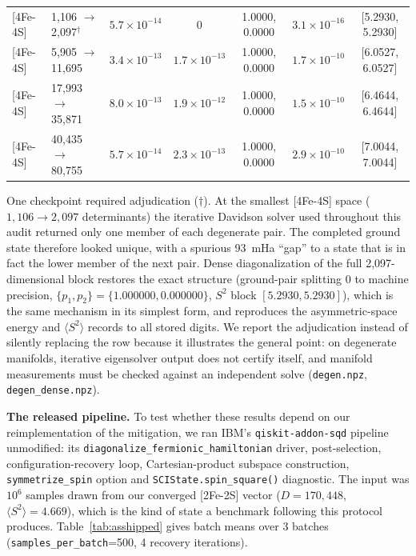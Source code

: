 \documentclass[11pt]{article}
\newcommand{\ssq}{\ensuremath{\langle S^2\rangle}}
\begin{document}
\begin{table}[t]
\begin{tabular}{llccccc}
{[4Fe-4S]} & 1,106 $\to$ 2,097$^\dagger$ & $5.7\times10^{-14}$ & $0$ & 1.0000, 0.0000 & $3.1\times10^{-16}$ & [5.2930, 5.2930] \\
{[4Fe-4S]} & 5,905 $\to$ 11,695 & $3.4\times10^{-13}$ & $1.7\times10^{-13}$ & 1.0000, 0.0000 & $1.7\times10^{-10}$ & [6.0527, 6.0527] \\
{[4Fe-4S]} & 17,993 $\to$ 35,871 & $8.0\times10^{-13}$ & $1.9\times10^{-12}$ & 1.0000, 0.0000 & $1.5\times10^{-10}$ & [6.4644, 6.4644] \\
{[4Fe-4S]} & 40,435 $\to$ 80,755 & $5.7\times10^{-14}$ & $2.3\times10^{-13}$ & 1.0000, 0.0000 & $2.9\times10^{-10}$ & [7.0044, 7.0044] \\
\hline
\end{tabular}
\end{table}

One checkpoint required adjudication ($\dagger$). At the smallest [4Fe-4S] space ($1{,}106 \to 2{,}097$ determinants) the iterative Davidson solver used throughout this audit returned only one member of each degenerate pair. The completed ground state therefore looked unique, with a spurious 93~mHa ``gap'' to a state that is in fact the lower member of the next pair. Dense diagonalization of the full 2,097-dimensional block restores the exact structure (ground-pair splitting 0 to machine precision, $\{p_1, p_2\} = \{1.000000, 0.000000\}$, $S^2$ block $[5.2930, 5.2930]$), which is the same mechanism in its simplest form, and reproduces the asymmetric-space energy and \ssq{} records to all stored digits. We report the adjudication instead of silently replacing the row because it illustrates the general point: on degenerate manifolds, iterative eigensolver output does not certify itself, and manifold measurements must be checked against an independent solve (\texttt{degen.npz}, \texttt{degen\_dense.npz}).

\textbf{The released pipeline.} To test whether these results depend on our reimplementation of the mitigation, we ran IBM's \texttt{qiskit-addon-sqd} pipeline unmodified: its \texttt{diagonalize\_fermionic\_hamiltonian} driver, post-selection, configuration-recovery loop, Cartesian-product subspace construction, \texttt{symmetrize\_spin} option and \texttt{SCIState.spin\_square()} diagnostic. The input was $10^6$ samples drawn from our converged [2Fe-2S] vector ($D=170{,}448$, $\ssq=4.669$), which is the kind of state a benchmark following this protocol produces. Table~\ref{tab:asshipped} gives batch means over 3 batches (\texttt{samples\_per\_batch}=500, 4 recovery iterations).
\end{document}
